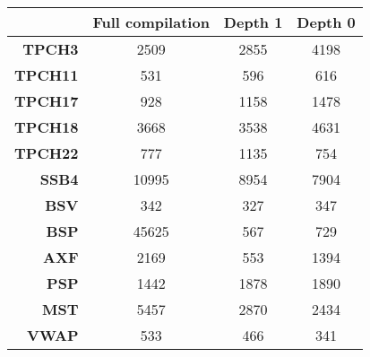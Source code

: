 \begin{tabular}{|r|c|c|c|}\hline 
\ & Full compilation & Depth 1 & Depth 0 \\\hline 
{\bf TPCH3}  & 2509 & 2855 & 4198 \\\hline
{\bf TPCH11} & 531 & 596 & 616 \\\hline
{\bf TPCH17} & 928 & 1158 & 1478 \\\hline
{\bf TPCH18} & 3668 & 3538 & 4631 \\\hline
{\bf TPCH22} & 777 & 1135 & 754 \\\hline
{\bf SSB4}   & 10995 & 8954 & 7904 \\\hline
{\bf BSV}    & 342 & 327 & 347 \\\hline
{\bf BSP}    & 45625 & 567 & 729 \\\hline
{\bf AXF}    & 2169 & 553 & 1394 \\\hline
{\bf PSP}    & 1442 & 1878 & 1890 \\\hline
{\bf MST}    & 5457 & 2870 & 2434 \\\hline
{\bf VWAP}   & 533 & 466 & 341 \\\hline
\end{tabular}